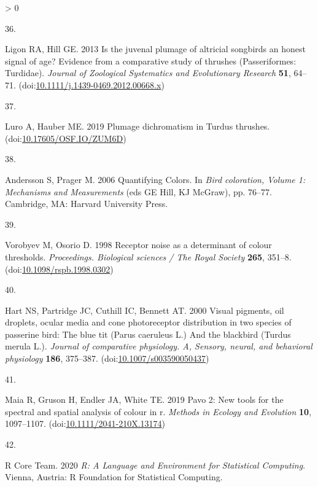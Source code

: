 \documentclass[
  a4paper,
]{article}
\newlength{\cslhangindent}
\newlength{\csllabelwidth}
\newenvironment{CSLReferences}[2] %
 {%
  \setlength{\parindent}{0pt}
  \ifodd #1 \everypar{\setlength{\hangindent}{\cslhangindent}}\ignorespaces\fi
  \ifnum #2 > 0
  \setlength{\parskip}{#2\baselineskip}
  \fi
 }%
 {}
\newcommand{\CSLLeftMargin}[1]{\parbox[t]{\csllabelwidth}{#1}}
\newcommand{\CSLRightInline}[1]{\parbox[t]{\linewidth - \csllabelwidth}{#1}\break}
\begin{document}
\begin{CSLReferences}{0}{0}
\leavevmode\hypertarget{ref-ligon2013}{}%
\CSLLeftMargin{36. }
\CSLRightInline{Ligon RA, Hill GE. 2013 Is the juvenal plumage of
altricial songbirds an honest signal of age? {Evidence} from a
comparative study of thrushes ({Passeriformes}: {Turdidae}).
\emph{Journal of Zoological Systematics and Evolutionary Research}
\textbf{51}, 64--71.
(doi:\href{https://doi.org/10.1111/j.1439-0469.2012.00668.x}{10.1111/j.1439-0469.2012.00668.x})}

\leavevmode\hypertarget{ref-luro2019}{}%
\CSLLeftMargin{37. }
\CSLRightInline{Luro A, Hauber ME. 2019 Plumage dichromatism in {Turdus}
thrushes.
(doi:\href{https://doi.org/10.17605/OSF.IO/ZUM6D}{10.17605/OSF.IO/ZUM6D})}

\leavevmode\hypertarget{ref-andersson2006}{}%
\CSLLeftMargin{38. }
\CSLRightInline{Andersson S, Prager M. 2006 Quantifying {Colors}. In
\emph{Bird coloration, {Volume} 1: {Mechanisms} and {Measurements}} (eds
GE Hill, KJ McGraw), pp. 76--77. {Cambridge, MA}: {Harvard University
Press}. }

\leavevmode\hypertarget{ref-vorobyev1998}{}%
\CSLLeftMargin{39. }
\CSLRightInline{Vorobyev M, Osorio D. 1998 Receptor noise as a
determinant of colour thresholds. \emph{Proceedings. Biological sciences
/ The Royal Society} \textbf{265}, 351--8.
(doi:\href{https://doi.org/10.1098/rspb.1998.0302}{10.1098/rspb.1998.0302})}

\leavevmode\hypertarget{ref-hart2000}{}%
\CSLLeftMargin{40. }
\CSLRightInline{Hart NS, Partridge JC, Cuthill IC, Bennett AT. 2000
Visual pigments, oil droplets, ocular media and cone photoreceptor
distribution in two species of passerine bird: The blue tit ({Parus}
caeruleus {L}.) And the blackbird ({Turdus} merula {L}.). \emph{Journal
of comparative physiology. A, Sensory, neural, and behavioral
physiology} \textbf{186}, 375--387.
(doi:\href{https://doi.org/10.1007/s003590050437}{10.1007/s003590050437})}

\leavevmode\hypertarget{ref-maia2019}{}%
\CSLLeftMargin{41. }
\CSLRightInline{Maia R, Gruson H, Endler JA, White TE. 2019 Pavo 2:
{New} tools for the spectral and spatial analysis of colour in r.
\emph{Methods in Ecology and Evolution} \textbf{10}, 1097--1107.
(doi:\href{https://doi.org/10.1111/2041-210X.13174}{10.1111/2041-210X.13174})}

\leavevmode\hypertarget{ref-rcoreteam2020}{}%
\CSLLeftMargin{42. }
\CSLRightInline{R Core Team. 2020 \emph{R: {A Language} and
{Environment} for {Statistical Computing}}. {Vienna, Austria}: {R
Foundation for Statistical Computing}. }


\end{CSLReferences}
\end{document}
